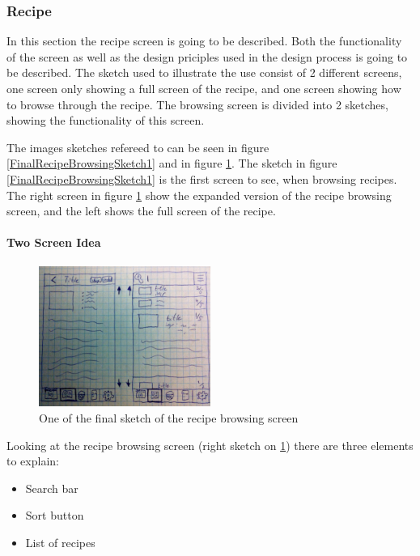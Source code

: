\subsubsection{Recipe}
In this section the recipe screen is going to be described. Both the functionality of the screen as well as the design priciples used in the design process is going to be described. The sketch used to illustrate the use consist of 2 different screens, one screen only showing a full screen of the recipe, and one screen showing how to browse through the recipe. The browsing screen is divided into 2 sketches, showing the functionality of this screen.

The images sketches refereed to can be seen in figure \ref{FinalRecipeBrowsingSketch1} and in figure \ref{FinalRecipeBrowsingSketch2}. The sketch in figure \ref{FinalRecipeBrowsingSketch1} is the first screen to see, when browsing recipes. The right screen in figure \ref{FinalRecipeBrowsingSketch2} show the expanded version of the recipe browsing screen, and the left shows the full screen of the recipe.

\paragraph{Two Screen Idea}

\begin{figure}[H]
    \centering
    \includegraphics[width=0.5\textwidth]{Grafik/FoodPlanner/FinalRecipeBrowsingSketch2}
    \caption{One of the final sketch of the recipe browsing screen}
    \label{FinalRecipeBrowsingSketch2}
\end{figure}

Looking at the recipe browsing screen (right sketch on \cref{FinalRecipeBrowsingSketch2}) there are three elements to explain: 

\begin{itemize}
    \item Search bar
    \item Sort button
    \item List of recipes
\end{itemize}


